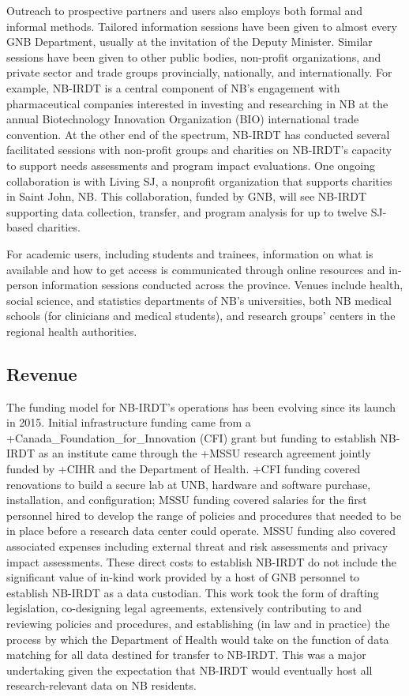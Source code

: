 \documentclass[
]{book}
\begin{document}
Outreach to prospective partners and users also employs both formal and informal methods. Tailored information sessions have been given to almost every GNB Department, usually at the invitation of the Deputy Minister. Similar sessions have been given to other public bodies, non-profit organizations, and private sector and trade groups provincially, nationally, and internationally. For example, NB-IRDT is a central component of NB's engagement with pharmaceutical companies interested in investing and researching in NB at the annual Biotechnology Innovation Organization (BIO) international trade convention. At the other end of the spectrum, NB-IRDT has conducted several facilitated sessions with non-profit groups and charities on NB-IRDT's capacity to support needs assessments and program impact evaluations. One ongoing collaboration is with Living SJ, a nonprofit organization that supports charities in Saint John, NB. This collaboration, funded by GNB, will see NB-IRDT supporting data collection, transfer, and program analysis for up to twelve SJ-based charities.

For academic users, including students and trainees, information on what is available and how to get access is communicated through online resources and in-person information sessions conducted across the province. Venues include health, social science, and statistics departments of NB's universities, both NB medical schools (for clinicians and medical students), and research groups' centers in the regional health authorities.

\hypertarget{revenue-1}{%
\subsection{Revenue}\label{revenue-1}}

The funding model for NB-IRDT's operations has been evolving since its launch in 2015. Initial infrastructure funding came from a +Canada\_Foundation\_for\_Innovation\textbar{} (CFI) grant but funding to establish NB-IRDT as an institute came through the +MSSU\textbar{} research agreement jointly funded by +CIHR\textbar{} and the Department of Health. +CFI\textbar{} funding covered renovations to build a secure lab at UNB, hardware and software purchase, installation, and configuration; MSSU funding covered salaries for the first personnel hired to develop the range of policies and procedures that needed to be in place before a research data center could operate. MSSU funding also covered associated expenses including external threat and risk assessments and privacy impact assessments. These direct costs to establish NB-IRDT do not include the significant value of in-kind work provided by a host of GNB personnel to establish NB-IRDT as a data custodian. This work took the form of drafting legislation, co-designing legal agreements, extensively contributing to and reviewing policies and procedures, and establishing (in law and in practice) the process by which the Department of Health would take on the function of data matching for all data destined for transfer to NB-IRDT. This was a major undertaking given the expectation that NB-IRDT would eventually host all research-relevant data on NB residents.
\end{document}

